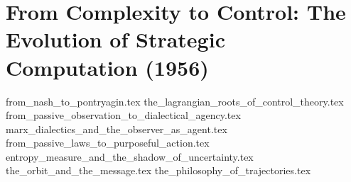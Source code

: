 \section{From Complexity to Control: The Evolution of Strategic Computation (1956)}

{from_nash_to_pontryagin.tex}
{the_lagrangian_roots_of_control_theory.tex}
{from_passive_observation_to_dialectical_agency.tex}
{marx_dialectics_and_the_observer_as_agent.tex}
{from_passive_laws_to_purposeful_action.tex}
{entropy_measure_and_the_shadow_of_uncertainty.tex}
{the_orbit_and_the_message.tex}
{the_philosophy_of_trajectories.tex}